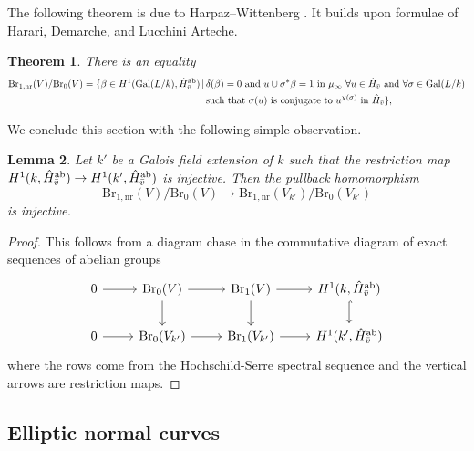 \documentclass[10pt,letterpaper,twoside]{article}
\renewcommand{\1}{\mathbf{1}}
\newcommand{\nr}{\mathrm{nr}}
\newcommand{\Br}{\mathrm{Br}}
\theoremstyle{plain}
\newtheorem{theorem}{Theorem}[section]
\newtheorem{lemma}[theorem]{Lemma}
\theoremstyle{plain}
\theoremstyle{definition}
\theoremstyle{named}
\theoremstyle{definition}
\begin{document}
	The following theorem is due to Harpaz--Wittenberg \cite[Proposition 3.3]{}. It builds upon formulae of Harari, Demarche, and Lucchini Arteche.
	
	
	\begin{theorem}\label{brauer-homogeneous}
		There is an equality
		\begin{align*}
			\Br_{1,\nr}(V)/\Br_0(V) = \{\beta \in H^1(\mathrm{Gal}(L/k), \hat{H}^{\mathrm{ab}}_{\Bar{v}}) \,|\,& \delta(\beta) = 0 \text{ and } u \cup \sigma^*\beta = 1 \text{ in $\mu_\infty$ $\forall u \in \hat{H}_{\Bar{v}}$ and $\forall \sigma \in \mathrm{Gal}(L/k)$}\\
			&\text{such that $\sigma(u)$ is conjugate to $u^{\chi(\sigma)}$ in $\hat{H}_{\Bar{v}}$}\},
		\end{align*}
	\end{theorem}
	
	We conclude this section with the following simple observation.
	
	\begin{lemma}\label{injective-res}
		Let $k'$ be a Galois field extension of $k$ such that the restriction map $H^1(k,\hat{H}^{\mathrm{ab}}_{\Bar{v}})\to H^1(k',\hat{H}^{\mathrm{ab}}_{\Bar{v}})$ is injective. Then the pullback homomorphism 
		\[\Br_{1,\nr}(V)/\Br_0(V)\to \Br_{1,\nr}(V_{k'})/\Br_0(V_{k'})\]
		is injective.
	\end{lemma}
	
	\begin{proof}
		This follows from a diagram chase in the commutative diagram of exact sequences of abelian groups
		\[
		\begin{tikzcd}
			0\arrow[r] &  \Br_0(V) \arrow[r] \arrow[d] & \Br_1(V) \arrow[r] \arrow[d] & H^1(k,\hat{H}^{\mathrm{ab}}_{\Bar{v}})\arrow[d,hook] \\
			0\arrow[r] &  \Br_0(V_{k'}) \arrow[r] & \Br_1(V_{k'}) \arrow[r] & H^1(k',\hat{H}^{\mathrm{ab}}_{\Bar{v}})
		\end{tikzcd}
		\]
		where the rows come from the Hochschild-Serre spectral sequence and the vertical arrows are restriction maps. 
	\end{proof}
	
	
	
	
	
	
	\subsection{Elliptic normal curves}
	
	
	
\end{document}
